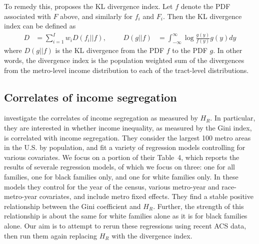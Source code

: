\documentclass[12pt]{article}
\begin{document}
To remedy this, \citet{roberto2015divergence} proposes the KL divergence index. Let $f$ denote the PDF associated with $F$ above, and similarly for $f_i$ and $F_i$. Then the KL divergence index can be defined as
  \begin{align}
    D &= \sum_{i=1}^Iw_i D(f_i||f), &&& D(g||f)&= \int_{-\infty}^{\infty}\log \frac{g(y)}{f(y)}g(y)dy \label{eq:div}
  \end{align}
  where $D(g||f)$ is the KL divergence from the PDF $f$ to the PDF $g$. In other words, the divergence index is the population weighted sum of the divergences from the metro-level income distribution to each of the tract-level distributions.

\subsection{Correlates of income segregation}\label{sec:correlates}
\citet{reardon2011income} investigate the correlates of income segregation as measured by $H_R$. In particular, they are interested in whether income inequality, as measured by the Gini index, is correlated with income segregation. They consider the largest 100 metro areas in the U.S. by population, and fit a variety of regression models controlling for various covariates. We focus on a portion of their Table~4, which reports the results of severale regression models, of which we focus on three: one for all families, one for black families only, and one for white families only. In these models they control for the year of the census, various metro-year and race-metro-year covariates, and include metro fixed effects. They find a stable positive relationship between the Gini coefficient and $H_R$. Further, the strength of this relationship is about the same for white families alone as it is for black families alone.  Our aim is to attempt to rerun these regressions using recent ACS data, then run them again replacing $H_R$ with the divergence index.
\end{document}
